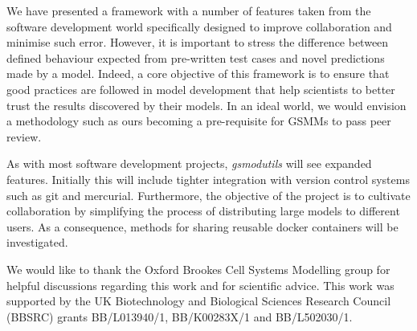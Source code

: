 \documentclass[journal=asbcd6,10pt]{achemso}
\begin{document}
We have presented a framework with a number of features taken from the software development world specifically designed to improve collaboration and minimise such error.
However, it is important to stress the difference between defined behaviour expected from pre-written test cases and novel predictions made by a model.
Indeed, a core objective of this framework is to ensure that good practices are followed in model development that help scientists to better trust the results discovered by their models.
In an ideal world, we would envision a methodology such as ours becoming a pre-requisite for GSMMs to pass peer review.

As with most software development projects, \textit{gsmodutils} will see expanded features.
Initially this will include tighter integration with version control systems such as git and mercurial.
Furthermore, the objective of the project is to cultivate collaboration by simplifying the process of distributing large models to different users.
As a consequence, methods for sharing reusable docker containers will be investigated.


\begin{acknowledgement}
We would like to thank the Oxford Brookes Cell Systems Modelling group for helpful discussions regarding this work and for scientific advice.
This work was supported by the UK Biotechnology and Biological Sciences Research Council (BBSRC) grants BB/L013940/1,  BB/K00283X/1 and BB/L502030/1.
\end{acknowledgement}



\end{document}
